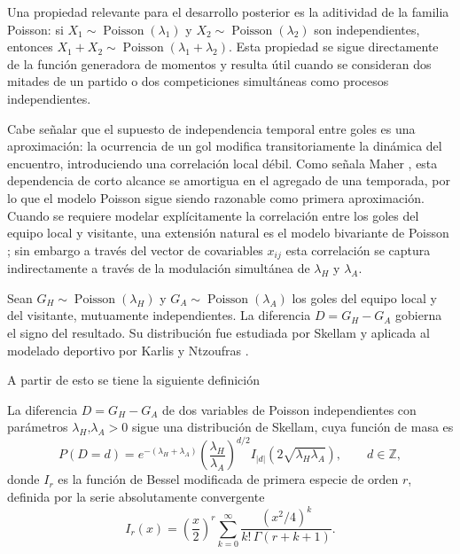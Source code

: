 Una propiedad relevante para el desarrollo posterior es la aditividad de la familia Poisson: si $X_1 \sim \operatorname{Poisson}(\lambda_1)$ y $X_2 \sim \operatorname{Poisson}(\lambda_2)$ son independientes, entonces $X_1 + X_2 \sim \operatorname{Poisson}(\lambda_1 + \lambda_2)$. Esta propiedad se sigue directamente de la funci\'on generadora de momentos y resulta \'util cuando se consideran dos mitades de un partido o dos competiciones simult\'aneas como procesos independientes.

Cabe se\~nalar que el supuesto de independencia temporal entre goles es una aproximaci\'on: la ocurrencia de un gol modifica transitoriamente la din\'amica del encuentro, introduciendo una correlaci\'on local d\'ebil. Como se\~nala Maher \cite{maher1982}, esta dependencia de corto alcance se amortigua en el agregado de una temporada, por lo que el modelo Poisson sigue siendo razonable como primera aproximaci\'on. Cuando se requiere modelar expl\'icitamente la correlaci\'on entre los goles del equipo local y visitante, una extensi\'on natural es el modelo bivariante de Poisson \cite{karlis2003}; sin embargo a trav\'es del vector de covariables $x_{ij}$ esta correlaci\'on se captura indirectamente a trav\'es de la modulaci\'on simult\'anea de $\lambda_H$ y $\lambda_A$.

Sean $G_H \sim \operatorname{Poisson}(\lambda_H)$ y $G_A \sim \operatorname{Poisson}(\lambda_A)$ los goles del equipo local y del visitante, mutuamente independientes. La diferencia $D = G_H - G_A$ gobierna el signo del resultado. Su distribuci\'on fue estudiada por Skellam \cite{skellam1946} y aplicada al modelado deportivo por Karlis y Ntzoufras \cite{karlis2003}.

A partir de esto se tiene la siguiente definici\'on

\begin{definition}\label{def:skellam}
	La diferencia $D = G_H - G_A$ de dos variables de Poisson independientes con par\'ametros $\lambda_H\text{,}\lambda_A>0$ sigue una distribuci\'on de Skellam, cuya funci\'on de masa es
	\begin{equation}\label{eq:skellam_pmf}
		P(D=d) = e^{-(\lambda_H + \lambda_A)} \left(\frac{\lambda_H}{\lambda_A}\right)^{d/2} I_{|d|}\!\left(2\sqrt{\lambda_H \lambda_A}\right), \qquad d \in \mathbb{Z},
	\end{equation}
	donde $I_r$ es la funci\'on de Bessel modificada de primera especie de orden $r$, definida por la serie absolutamente convergente
	\begin{equation}\label{eq:bessel_series}
		I_r(x) = \left(\frac{x}{2}\right)^{r} \sum_{k=0}^{\infty} \frac{(x^2/4)^{k}}{k!\,\Gamma(r + k + 1)}.
	\end{equation}
\end{definition}

